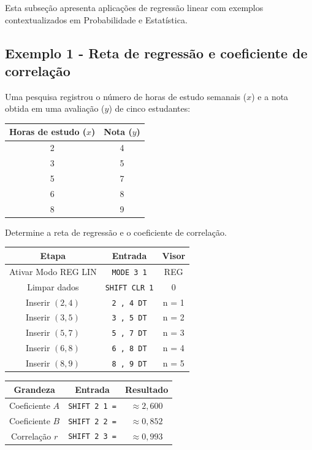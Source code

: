 Esta subseção apresenta aplicações de regressão linear com exemplos contextualizados em Probabilidade e Estatística.

\subsection*{Exemplo 1 - Reta de regressão e coeficiente de correlação}

Uma pesquisa registrou o número de horas de estudo semanais ($x$) e a nota obtida em uma avaliação ($y$) de cinco estudantes:

\begin{table}[H]
    \centering
    \begin{tabular}{|c|c|}
        \hline
        \textbf{Horas de estudo} ($x$) & \textbf{Nota} ($y$) \\ \hline
        2 & 4 \\
        3 & 5 \\
        5 & 7 \\
        6 & 8 \\
        8 & 9 \\ \hline
    \end{tabular}
\end{table}

Determine a reta de regressão e o coeficiente de correlação.

\begin{table}[H]
    \centering
    \begin{tabular}{|c|c|c|}
        \hline
        \textbf{Etapa} & \textbf{Entrada} & \textbf{Visor} \\ \hline
        Ativar Modo REG LIN & \texttt{MODE 3 1} & REG \\
        Limpar dados & \texttt{SHIFT CLR 1} & 0 \\
        Inserir $(2, 4)$ & \texttt{2 , 4 DT} & n = 1 \\
        Inserir $(3, 5)$ & \texttt{3 , 5 DT} & n = 2 \\
        Inserir $(5, 7)$ & \texttt{5 , 7 DT} & n = 3 \\
        Inserir $(6, 8)$ & \texttt{6 , 8 DT} & n = 4 \\
        Inserir $(8, 9)$ & \texttt{8 , 9 DT} & n = 5 \\ \hline
    \end{tabular}
\end{table}

\begin{table}[H]
    \centering
    \begin{tabular}{|c|c|c|}
        \hline
        \textbf{Grandeza} & \textbf{Entrada} & \textbf{Resultado} \\ \hline
        Coeficiente $A$ & \texttt{SHIFT 2 1 =} & $\approx 2{,}600$ \\
        Coeficiente $B$ & \texttt{SHIFT 2 2 =} & $\approx 0{,}852$ \\
        Correlação $r$  & \texttt{SHIFT 2 3 =} & $\approx 0{,}993$ \\ \hline
    \end{tabular}
\end{table}

